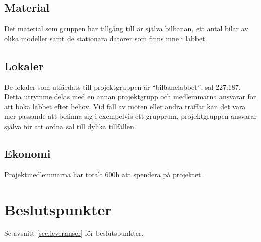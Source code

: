 \documentclass[10pt,swedish,oneside]{lips-no_customer}
\begin{document}
		\subsection{Material}
		Det material som gruppen har tillgång till är själva bilbanan, ett antal bilar av olika modeller samt de stationära datorer som finns inne i labbet. 
		\subsection{Lokaler}
		De lokaler som utfärdats till projektgruppen är “bilbanelabbet”, sal 227:187. Detta utrymme delas med en annan projektgrupp och medlemmarna ansvarar för att boka labbet efter behov. Vid fall av möten eller andra träffar kan det vara mer passande att befinna sig i exempelvis ett grupprum, projektgruppen ansvarar själva för att ordna sal till dylika tillfällen.
		\subsection{Ekonomi}
		Projektmedlemmarna har totalt 600h att spendera på projektet. 
	
	\section{Beslutspunkter}
		Se avsnitt \ref{sec:leveranser} för beslutspunkter.
		
\end{document}
